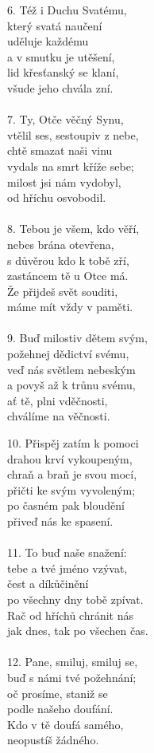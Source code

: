 \begin{translatioMulticol}{3}
{\color{red}6. }Též i Duchu Svatému,\\
který svatá naučení\\
uděluje každému\\
a v smutku je utěšení,\\
lid křesťanský se klaní,\\
všude jeho chvála zní.\\
\\
{\color{red}7. }Ty, Otče věčný Synu,\\
vtělil ses, sestoupiv z nebe,\\
chtě smazat naši vinu\\
vydals na smrt kříže sebe;\\
milost jsi nám vydobyl,\\
od hříchu osvobodil.\\
\\
{\color{red}8. }Tebou je všem, kdo věří,\\
nebes brána otevřena,\\
s důvěrou kdo k tobě zří,\\
zastáncem tě u Otce má.\\
Že přijdeš svět souditi,\\
máme mít vždy v paměti.\\
\\
{\color{red}9. }Buď milostiv dětem svým,\\
požehnej dědictví svému,\\
veď nás světlem nebeským\\
a povyš až k trůnu svému,\\
ať tě, plni vděčnosti,\\
chválíme na věčnosti.\columnbreak

{\color{red}10. }Přispěj zatím k pomoci\\
drahou krví vykoupeným,\\
chraň a braň je svou mocí,\\
přičti ke svým vyvoleným;\\
po časném pak bloudění\\
přiveď nás ke spasení.\\
\\
{\color{red}11. }To buď naše snažení:\\
tebe a tvé jméno vzývat,\\
čest a díkůčinění\\
po všechny dny tobě zpívat.\\
Rač od hříchů chránit nás\\
jak dnes, tak po všechen čas.\\
\\
{\color{red}12. }Pane, smiluj, smiluj se,\\
buď s námi tvé požehnání;\\
oč prosíme, staniž se\\
podle našeho doufání.\\
Kdo v tě doufá samého,\\
neopustíš žádného.
\end{translatioMulticol}
